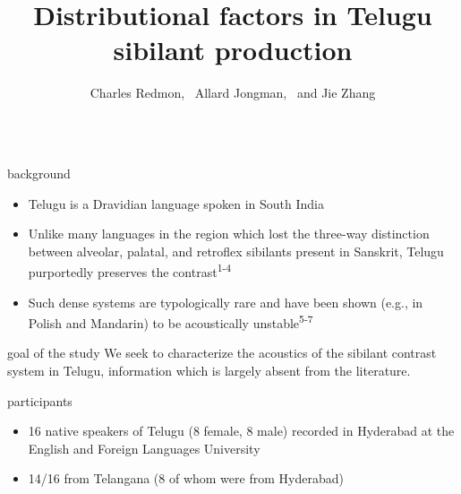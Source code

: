 \documentclass[serif, mathserif, final, xcolor=table]{beamer}
\title{Distributional factors in Telugu sibilant production}
\author{Charles Redmon,~ Allard Jongman,~ and Jie Zhang}
\institute{Department of Linguistics,~ University of Kansas; Lawrence, KS, USA}
\newcommand{\ssref}[1]{\textsuperscript{\color{blue}#1}}
\begin{document}
\begin{frame}[t]{}
\vspace{-1cm}
  \begin{columns}[t]

    \begin{column}{0.24\linewidth}

      \begin{block}{background}
        \small
        \begin{itemize}
          \item Telugu is a Dravidian language spoken in South India
          \item Unlike many languages in the region which lost the three-way distinction between alveolar, palatal, and retroflex sibilants present in Sanskrit, Telugu purportedly preserves the contrast\ssref{1-4}
          \item Such dense systems are typologically rare and have been shown (e.g., in Polish and Mandarin) to be acoustically unstable\ssref{5-7}
        \end{itemize}

      \end{block}

      \begin{block}{goal of the study}
      \small
We seek to characterize the acoustics of the sibilant contrast system in Telugu, information which is largely absent from the literature.
      \end{block}

	\vspace{-1.25cm}

      \begin{block}{participants}
        \small
        \begin{itemize}
          \item 16 native speakers of Telugu (8 female, 8 male) recorded in Hyderabad at the English and Foreign Languages University
          \item 14/16 from Telangana (8 of whom were from Hyderabad)
        \end{itemize}
      \end{block}


\end{column}
\end{columns}
\end{frame}
\end{document}
